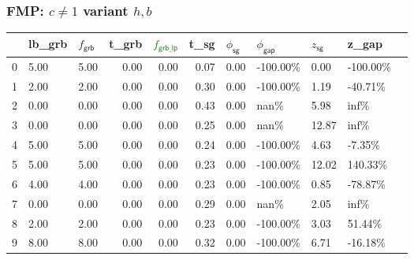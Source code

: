 \begin{frame}
  \frametitle{FMP: \(c \neq 1\) variant \(h, b\)}
  \scriptsize
  \begin{tabular}{lllrrrlllll}
    \toprule
    {} & lb\_grb              & \(f_{\textsf{grb}}\)   & t\_grb                  & \textcolor{green}{\(f_{\textsf{grb\_lp}}\)}
       & t\_sg                & \(\phi_{\textsf{sg}}\) & \(\phi_{\textsf{gap}}\)
       & \( z_{\textsf{sg}}\) & z\_gap                                                                                                                                        \\
    \midrule
    0  & 5.00                 & 5.00                   & 0.00                    & 0.00                                        & 0.07 & 0.00  & -100.00\% & 0.00  & -100.00\% \\
    1  & 2.00                 & 2.00                   & 0.00                    & 0.00                                        & 0.30 & 0.00  & -100.00\% & 1.19  & -40.71\%  \\
    2  & 0.00                 & 0.00                   & 0.00                    & 0.00                                        & 0.43 & 0.00  & nan\%     & 5.98  & inf\%     \\
    3  & 0.00                 & 0.00                   & 0.00                    & 0.00                                        & 0.25 & 0.00  & nan\%     & 12.87 & inf\%     \\
    4  & 5.00                 & 5.00                   & 0.00                    & 0.00                                        & 0.24 & 0.00  & -100.00\% & 4.63  & -7.35\%   \\
    5  & 5.00                 & 5.00                   & 0.00                    & 0.00                                        & 0.23 & 0.00  & -100.00\% & 12.02 & 140.33\%  \\
    6  & 4.00                 & 4.00                   & 0.00                    & 0.00                                        & 0.23 & 0.00  & -100.00\% & 0.85  & -78.87\%  \\
    7  & 0.00                 & 0.00                   & 0.00                    & 0.00                                        & 0.29 & 0.00  & nan\%     & 2.05  & inf\%     \\
    8  & 2.00                 & 2.00                   & 0.00                    & 0.00                                        & 0.23 & 0.00  & -100.00\% & 3.03  & 51.44\%   \\
    9  & 8.00                 & 8.00                   & 0.00                    & 0.00                                        & 0.32 & 0.00  & -100.00\% & 6.71  & -16.18\%  \\

\end{tabular}
\end{frame}
